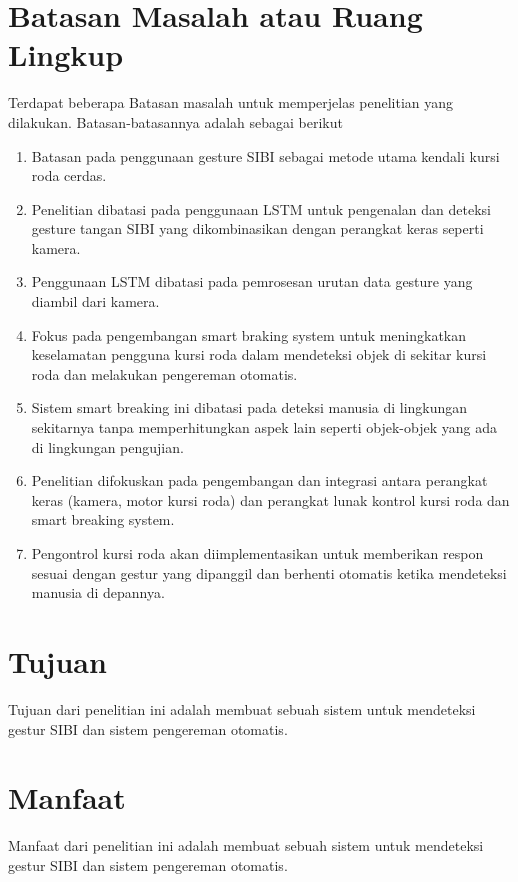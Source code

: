 \section{Batasan Masalah atau Ruang Lingkup}

Terdapat beberapa Batasan masalah untuk memperjelas penelitian yang dilakukan. Batasan-batasannya adalah sebagai berikut

\begin{enumerate}
    \item Batasan pada penggunaan gesture SIBI sebagai metode utama kendali kursi roda cerdas.
    \item Penelitian dibatasi pada penggunaan LSTM untuk pengenalan dan deteksi gesture tangan SIBI yang dikombinasikan dengan perangkat keras seperti kamera.
    \item Penggunaan LSTM dibatasi pada pemrosesan urutan data gesture yang diambil dari kamera.
    \item Fokus pada pengembangan smart braking system untuk meningkatkan keselamatan pengguna kursi roda dalam mendeteksi objek di sekitar kursi roda dan melakukan pengereman otomatis. 
    \item Sistem smart breaking ini dibatasi pada deteksi manusia di lingkungan sekitarnya tanpa memperhitungkan aspek lain seperti objek-objek yang ada di lingkungan pengujian.
    \item Penelitian difokuskan pada pengembangan dan integrasi antara perangkat keras (kamera, motor kursi roda) dan perangkat lunak kontrol kursi roda dan smart breaking system.
    \item Pengontrol kursi roda akan diimplementasikan untuk memberikan respon sesuai dengan gestur yang dipanggil dan berhenti otomatis ketika mendeteksi manusia di depannya.
\end{enumerate}

\section{Tujuan}

Tujuan dari penelitian ini adalah membuat sebuah sistem untuk mendeteksi gestur SIBI dan sistem pengereman otomatis.

\section{Manfaat}

Manfaat dari penelitian ini adalah membuat sebuah sistem untuk mendeteksi gestur SIBI dan sistem pengereman otomatis.

